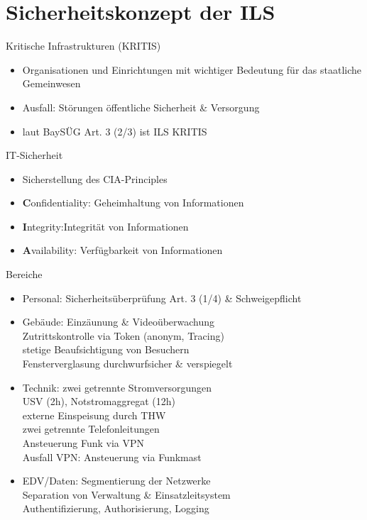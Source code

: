 \section{Sicherheitskonzept der ILS}
\begin{warningbox}{Kritische Infrastrukturen (KRITIS)}
   \begin{itemize}
        \item Organisationen und Einrichtungen mit wichtiger Bedeutung für das staatliche Gemeinwesen
        \item Ausfall: Störungen öffentliche Sicherheit \& Versorgung
        \item laut BaySÜG Art. 3 (2/3) ist ILS KRITIS
   \end{itemize}
\end{warningbox}
\begin{sectionbox}{IT-Sicherheit}
    \begin{itemize}
        \item Sicherstellung des CIA-Principles
        \item \textbf{C}onfidentiality: Geheimhaltung von Informationen
        \item \textbf{I}ntegrity:Integrität von Informationen
        \item \textbf{A}vailability: Verfügbarkeit von Informationen
    \end{itemize}
\end{sectionbox}
\begin{sectionbox}{Bereiche}
    \begin{itemize}
        \item Personal: Sicherheitsüberprüfung Art. 3 (1/4) \& Schweigepflicht
        \item Gebäude: Einzäunung \& Videoüberwachung\\ 
        \ra Zutrittskontrolle via Token (anonym, Tracing)\\
        \ra stetige Beaufsichtigung von Besuchern\\
        \ra Fensterverglasung durchwurfsicher \& verspiegelt
        \item Technik: zwei getrennte Stromversorgungen\\
        \ra USV (2h), Notstromaggregat (12h)\\
        \ra externe Einspeisung durch THW\\
        \ra zwei getrennte Telefonleitungen\\
        \ra Ansteuerung Funk via VPN\\
        \ra Ausfall VPN: Ansteuerung via Funkmast
        \item EDV/Daten: Segmentierung der Netzwerke\\
        \ra Separation von Verwaltung \& Einsatzleitsystem\\
        \ra Authentifizierung, Authorisierung, Logging
    \end{itemize}
\end{sectionbox}